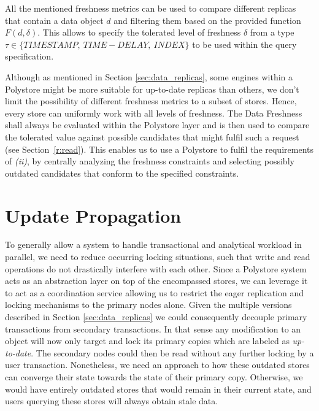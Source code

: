 All the mentioned freshness metrics can be used to compare different replicas that contain a data object $d$ and filtering them based on the provided function $F(d, \delta)$.
This allows to specify the tolerated level of freshness $\delta$ from a type $\tau \in \{TIMESTAMP, \:TIME-DELAY, \:INDEX\}$ to be used within the query specification.

Although as mentioned in Section \ref{sec:data_replicas}, some engines within a Polystore might be more suitable for up-to-date replicas than others,
we don't limit the possibility of different freshness metrics to a subset of stores. Hence, every store can uniformly work with all levels of freshness.
The Data Freshness shall always be evaluated within the Polystore layer and is then used to compare the tolerated value against possible candidates that might fulfil such a request 
(see Section~\ref{r:read}). This enables us to use a Polystore to fulfil the requirements of \textit{(ii)}, by centrally analyzing the freshness constraints and selecting possibly outdated 
candidates that conform to the specified constraints.







\section{Update Propagation}
\label{sec:propagation}

To generally allow a system to handle transactional and analytical workload in parallel, we need to reduce occurring locking situations,
such that write and read operations do not drastically interfere with each other.
Since a Polystore system acts as an abstraction layer on top of the encompassed stores, we can leverage it to act as a coordination service 
allowing us to restrict the eager replication and locking mechanisms to the primary nodes alone.
Given the multiple versions described in Section \ref{sec:data_replicas} we could consequently decouple primary transactions from 
secondary transactions. In that sense any modification to an object will now only target and lock its primary copies which are labeled as \emph{up-to-date}.
The secondary nodes could then be read without any further locking by a user transaction. 
Nonetheless, we need an approach to how these outdated stores can converge their state towards the state of their primary copy.
Otherwise, we would have entirely outdated stores that would remain in their current state, and users querying these stores will always obtain stale data. 


